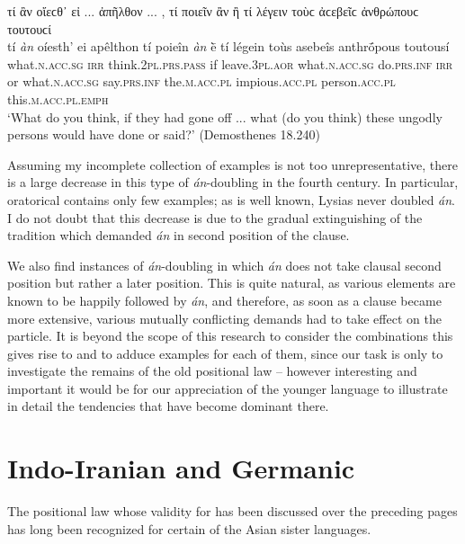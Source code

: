 \begin{exe}
\ex τί ἂν οἴεϲθ᾽ εἰ ... ἀπῆλθον ... , τί ποιεῖν ἂν ἢ τί λέγειν τοὺϲ ἀϲεβεῖϲ ἀνθρώπουϲ τουτουϲί\\
\gll tí \emph{àn} oíesth' ei apêlthon tí poieîn \emph{àn} ḕ tí légein toùs asebeîs anthrṓpous toutousí\\
what.\textsc{n.acc.sg} \textsc{irr} think.\textsc{2pl.prs.pass} if leave.\textsc{3pl.aor} what.\textsc{n.acc.sg} do.\textsc{prs.inf} \textsc{irr} or what.\textsc{n.acc.sg} say.\textsc{prs.inf} the.\textsc{m.acc.pl} impious.\textsc{acc.pl} person.\textsc{acc.pl} this.\textsc{m.acc.pl.emph}\\
\trans `What do you think, if they had gone off ... what (do you think) these ungodly persons would have done or said?' (Demosthenes 18.240)
\label{multian75}
\end{exe}

Assuming my incomplete collection of examples is not too unrepresentative, there is a large decrease in this type of \emph{án}-doubling in the fourth century. In particular, oratorical  contains only few examples; as is well known, Lysias never doubled \emph{án}. I do not doubt that this decrease is due to the gradual extinguishing of the tradition which demanded \emph{án} in second position of the clause.

We also find instances of \emph{án}-doubling in which \emph{án} does not take clausal second position but rather a later position. This is quite natural, as various elements are known to be happily followed by \emph{án}, and therefore, as soon as a clause became more extensive, various mutually conflicting demands had to take effect on the particle. It is beyond the scope of this research to consider the combinations this gives rise to and to adduce examples for each of them, since our task is only to investigate the remains of the old positional law -- however interesting and important it would be for our appreciation of the younger language to illustrate in detail the tendencies that have become dominant there.


\section{Indo-Iranian and Germanic}

The positional law whose validity for  has been discussed over the preceding pages has long been recognized for certain of the Asian sister languages.


